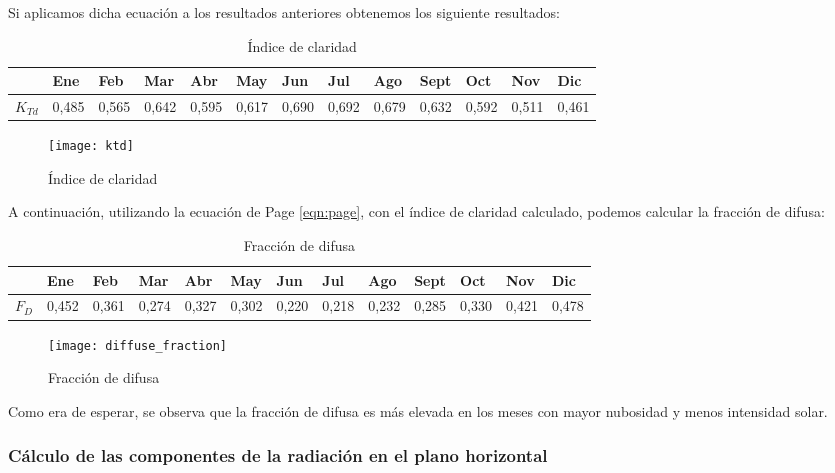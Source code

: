 Si aplicamos dicha ecuación a los resultados anteriores obtenemos los siguiente resultados:

\begin{table}[ht]
\centering
\begin{tabular}{|l|l|l|l|l|l|l|l|l|l|l|l|l|}
\hline
    & Ene & Feb & Mar & Abr & May & Jun & Jul & Ago & Sept & Oct & Nov & Dic \\ \hline
$K_{Td}$ & 0,485 & 0,565 & 0,642 & 0,595 & 0,617 & 0,690 & 0,692 & 0,679 & 0,632 & 0,592 & 0,511  & 0,461  \\ \hline
\end{tabular}
\label{tab:clarity_index}
\caption{Índice de claridad}
\end{table}

\begin{figure}[ht]
\texttt{[image: ktd]}
\centering
\caption{Índice de claridad}
\label{fig:clarity_index}
\end{figure}


A continuación, utilizando la ecuación de Page \ref{eqn:page}, con el índice de claridad calculado, podemos calcular la fracción de difusa:

\begin{table}[ht]
\centering
\begin{tabular}{|l|l|l|l|l|l|l|l|l|l|l|l|l|}
\hline
   		& Ene   & Feb   & Mar   & Abr   & May   & Jun   & Jul   & Ago   & Sept  & Oct   & Nov    & Dic    \\ \hline
$F_{D}$ & 0,452 & 0,361 & 0,274 & 0,327 & 0,302 & 0,220 & 0,218 & 0,232 & 0,285 & 0,330 & 0,421  & 0,478  \\ \hline
\end{tabular}
\label{tab:difuse_part}
\caption{Fracción de difusa}
\end{table}

\begin{figure}[H]
\texttt{[image: diffuse\_fraction]}
\centering
\caption{Fracción de difusa}
\label{fig:difuse_part}
\end{figure}

Como era de esperar, se observa que la fracción de difusa es más elevada en los meses con mayor nubosidad y menos intensidad solar.

\subsubsection{Cálculo de las componentes de la radiación  en el plano horizontal}

